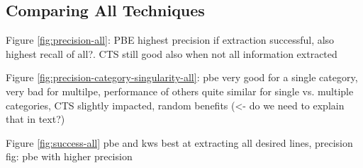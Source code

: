 \documentclass[\myrootdir/main.tex]{subfiles}
\begin{document}
\subsection{Comparing All Techniques}
Figure \ref{fig:precision-all}: PBE highest precision if extraction successful, also highest recall of all?. CTS still good also when not all information extracted

Figure \ref{fig:precision-category-singularity-all}: pbe very good for a single category, very bad for multilpe, performance of others quite similar for single vs. multiple categories, CTS slightly impacted, random benefits (<- do we need to explain that in text?)

Figure \ref{fig:success-all} pbe and kws best at extracting all desired lines, precision fig: pbe with higher precision
\end{document}
